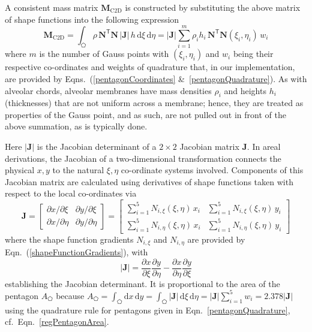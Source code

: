 A consistent mass matrix $\mathbf{M}_{\mathrm{C2D}}$ is constructed by substituting the above matrix of shape functions into the following expression
\begin{equation}
    \mathbf{M}_{\mathrm{C2D}} = \int_{\pentagon} \rho \, \mathbf{N}^{\mathsf{T}} \mathbf{N} \,|\mathbf{J}| \, h \, \mathrm{d} \xi \, \mathrm{d} \eta 
    = | \mathbf{J} | \sum_{i=1}^m \rho_i h_i \, \mathbf{N}^{\mathsf{T}} \mathbf{N} 
    (\xi_i , \eta_i) \, w_i
    \label{massintegral2d}
\end{equation}
where $m$ is the number of Gauss points with $( \xi_i , \eta_i )$ and $w_i$ being their respective co-ordinates and weights of quadrature that, in our implementation, are provided by Eqns.~(\ref{pentagonCoordinates} \&\ \ref{pentagonQuadrature}).  As with alveolar chords, alveolar membranes have mass densities $\rho_i$ and heights $h_i$ (thicknesses) that are not uniform across a membrane; hence, they are treated as properties of the Gauss point, and as such, are not pulled out in front of the above summation, as is typically done.

Here $|\mathbf{J}|$ is the Jacobian determinant of a $2 \! \times \! 2$ Jacobian matrix $\mathbf{J}$.  In areal derivations, the Jacobian of a two-dimensional transformation connects the physical ${x, y}$ to the natural ${\xi, \eta}$ co-ordinate systems involved.  Components of this Jacobian matrix are calculated using derivatives of shape functions taken with respect to the local co-ordinates via \cite[pg.~424]{Reddy93}
\begin{equation}
\mathbf{J} = 
\begin{bmatrix}
\partial x / \partial\xi & \partial y / \partial\xi \\
\partial x / \partial\eta & \partial y / \partial\eta 
\end{bmatrix}  
= \begin{bmatrix}
\sum\nolimits_{i=1}^5 N_{i,\xi} (\xi,\eta) \, x_i & \sum\nolimits_{i=1}^5 N_{i,\xi} (\xi,\eta) \, y_i \\
\sum\nolimits_{i=1}^5 N_{i,\eta} (\xi,\eta) \, x_i & \sum\nolimits_{i=1}^5 N_{i,\eta} (\xi,\eta) \, y_i
\end{bmatrix}
\label{jacobian2D}
\end{equation}
where the shape function gradients $N_{i,\xi}$ and $N_{i,\eta}$ are provided by Eqn.~(\ref{shapeFunctionGradients}), with
\begin{equation}
| \mathbf{J} | = \frac{\partial x}{\partial \xi} \frac{\partial y}{\partial \eta} - 
\frac{\partial x}{\partial \eta} \frac{\partial y}{\partial \xi}
\label{jacobianpent}
\end{equation}
establishing the Jacobian determinant.  It is proportional to the area of the pentagon $A_{\pentagon}$ because $A_{\pentagon} = \int_{\pentagon} \mathrm{d}x \, \mathrm{d}y = \int_{\pentagon} | \mathbf{J} | \, \mathrm{d}\xi \, \mathrm{d}\eta = | \mathbf{J} | \sum_{i=1}^5 w_i = 2.378 | \mathbf{J} |$ using the quadrature rule for pentagons given in Eqn.~\eqref{pentagonQuadrature}, cf.\ Eqn.~\eqref{regPentagonArea}.

